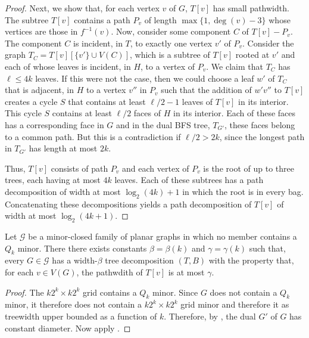 \documentclass{patmorin}
\DeclareMathOperator{\degree}{deg}
\begin{document}
\begin{proof}
  Next, we show that, for each vertex $v$ of $G$, $T[v]$ has small pathwidth.  
  The subtree $T[v]$ contains a path $P_v$ of length
  $\max\{1,\degree(v)-3\}$ whose vertices are those in $f^{-1}(v)$.
  Now, consider some component $C$ of $T[v]-P_v$.  The component $C$ is
  incident, in $T$, to exactly one vertex $v'$ of $P_v$.  Consider the
  graph $T_{C}=T[v][\{v'\}\cup V(C)]$, which is a subtree of $T[v]$ rooted
  at $v'$ and each of whose leaves is incident, in $H$, to a vertex of
  $P_v$.  We claim that $T_C$ has $\ell \le 4k$ leaves. If this were not
  the case, then we could choose a leaf $w'$ of $T_C$ that is adjacent,
  in $H$ to a vertex $v''$ in $P_v$ such that the addition of $w' v''$
  to $T[v]$ creates a cycle $S$ that contains at least $\ell/2-1$ leaves
  of $T[v]$ in its interior.  This cycle $S$ contains at least $\ell/2$
  faces of $H$ in its interior.  Each of these faces has a corresponding
  face in $G$ and in the dual BFS tree, $T_{G'}$, these faces belong to
  a common path.  But this is a contradiction if $\ell/2 > 2k$, since
  the longest path in $T_{G'}$ has length at most $2k$.

  Thus, $T[v]$ consists of path $P_v$ and each vertex of $P_v$ is the
  root of up to three trees, each having at most $4k$ leaves.  Each of
  these subtrees has a path decomposition of width at most $\log_2(4k)+1$
  in which the root is in every bag. Concatenating these decompositions
  yields a path decomposition of $T[v]$ of width at most $\log_2(4k+1)$. 
\end{proof}

\begin{thm}
  Let $\mathcal{G}$ be a minor-closed family of planar graphs in which
  no member contains a $Q_{k}$ minor.  There there exists constants
  $\beta=\beta(k)$ and $\gamma=\gamma(k)$ such that, every $G\in
  \mathcal{G}$ has a width-$\beta$ tree decomposition $(T,B)$ with the
  property that, for each $v\in V(G)$, the pathwdith of $T[v]$ is at
  most $\gamma$.
\end{thm}


\begin{proof}
  The $k2^k\times k2^k$ grid contains a $Q_k$ minor.
  Since $G$ does not contain a $Q_{k}$ minor, it therefore does not contain
  a $k2^k\times k2^k$ grid minor and therefore it as treewidth upper bounded
  as a function of $k$.
  Therefore, by , the dual $G'$ of $G$ has constant
  diameter.  Now apply .
\end{proof}
\end{document}
